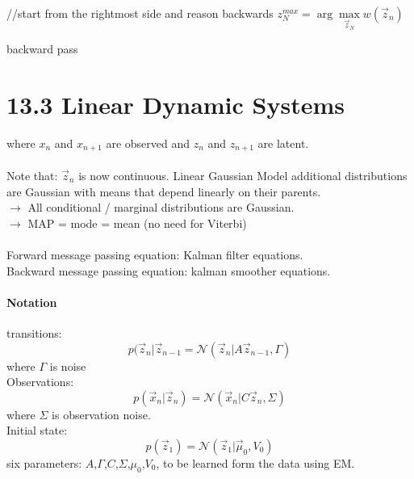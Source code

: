 \documentclass[11pt]{article}
\begin{document}
\begin{algorithm}[H]
\SetAlgoLined
 //start from the rightmost side and reason backwards\;
 $z_N^{max}=\arg\max\limits_{\vec{z}_N}w(\vec{z}_n)$

 \caption{backward pass}
\end{algorithm}


\section{13.3 Linear Dynamic Systems}


\begin{center}
\end{center}
where $x_n$ and $x_{n+1}$ are observed and $z_n$ and $z_{n+1}$ are latent.\\
\\
Note that: $\vec{z}_n$ is now continuous. Linear Gaussian Model additional distributions are Gaussian with means that depend linearly on their parents.\\
$\rightarrow$ All conditional / marginal distributions are Gaussian.\\
$\rightarrow$ MAP = mode =  mean (no need for Viterbi)\\
\\
Forward message passing equation: Kalman filter equations.\\
Backward message passing equation: kalman smoother equations.

\paragraph{Notation}
transitions:
\[p(\vec{z}_n|\vec{z}_{n-1}=\mathcal{N}(\vec{z}_n|A\vec{z}_{n-1},\Gamma)\]
where $\Gamma$ is noise\\
Observations:
\[p(\vec{x}_n|\vec{z}_n)=\mathcal{N}(\vec{x}_n|C\vec{z}_n,\Sigma)\]
where $\Sigma $ is observation noise.\\
Initial state:
\[p(\vec{z}_1) = \mathcal{N}(\vec{z}_1|\vec{\mu}_0,V_0)\]
six parameters: $A$,$\Gamma$,$C$,$\Sigma$,$\mu_0$,$V_0$, to be learned form the data using EM.
\end{document}
